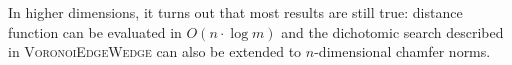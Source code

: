 \documentclass{llncs}
\begin{document}
\sloppy In higher dimensions, it turns out that most results are still
true: distance function can be evaluated in $O(n\cdot\log{m})$ and the
dichotomic search described in \textsc{VoronoiEdgeWedge} can also be
extended to $n$-dimensional chamfer norms.





\end{document}
